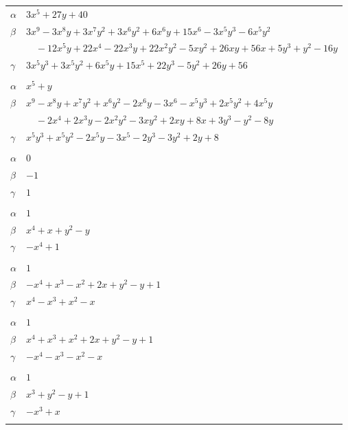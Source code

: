 \documentclass[11pt]{article}
\begin{document}
\begin{longtable}{@{}ll@{}}
$\alpha$ & $3x^{5}+27y+40$\\
$\beta$ & $3x^{9}-3x^{8}y+3x^{7}y^{2}+3x^{6}y^{2}+6x^{6}y+15x^{6}-3x^{5}y^{3}-6x^{5}y^{2}$\\
 & $\quad -12x^{5}y+22x^{4}-22x^{3}y+22x^{2}y^{2}-5xy^{2}+26xy+56x+5y^{3}+y^{2}-16y$\\
$\gamma$ & $3x^{5}y^{3}+3x^{5}y^{2}+6x^{5}y+15x^{5}+22y^{3}-5y^{2}+26y+56$\\
\addlinespace[3pt]
\multicolumn{2}{@{}l}{$\{i,j\}=\{1,33\}$, $k_{ij}=2^{4}$}\\
$\alpha$ & $x^{5}+y$\\
$\beta$ & $x^{9}-x^{8}y+x^{7}y^{2}+x^{6}y^{2}-2x^{6}y-3x^{6}-x^{5}y^{3}+2x^{5}y^{2}+4x^{5}y$\\
 & $\quad -2x^{4}+2x^{3}y-2x^{2}y^{2}-3xy^{2}+2xy+8x+3y^{3}-y^{2}-8y$\\
$\gamma$ & $x^{5}y^{3}+x^{5}y^{2}-2x^{5}y-3x^{5}-2y^{3}-3y^{2}+2y+8$\\
\addlinespace[3pt]
\multicolumn{2}{@{}l}{$\{i,j\}=\{2,9\}$, $k_{ij}=3$}\\
$\alpha$ & $0$\\
$\beta$ & $-1$\\
$\gamma$ & $1$\\
\addlinespace[3pt]
\multicolumn{2}{@{}l}{$\{i,j\}=\{2,10\}$, $k_{ij}=3$}\\
$\alpha$ & $1$\\
$\beta$ & $x^{4}+x+y^{2}-y$\\
$\gamma$ & $-x^{4}+1$\\
\addlinespace[3pt]
\multicolumn{2}{@{}l}{$\{i,j\}=\{2,14\}$, $k_{ij}=3$}\\
$\alpha$ & $1$\\
$\beta$ & $-x^{4}+x^{3}-x^{2}+2x+y^{2}-y+1$\\
$\gamma$ & $x^{4}-x^{3}+x^{2}-x$\\
\addlinespace[3pt]
\multicolumn{2}{@{}l}{$\{i,j\}=\{2,16\}$, $k_{ij}=3$}\\
$\alpha$ & $1$\\
$\beta$ & $x^{4}+x^{3}+x^{2}+2x+y^{2}-y+1$\\
$\gamma$ & $-x^{4}-x^{3}-x^{2}-x$\\
\addlinespace[3pt]
\multicolumn{2}{@{}l}{$\{i,j\}=\{2,17\}$, $k_{ij}=3$}\\
$\alpha$ & $1$\\
$\beta$ & $x^{3}+y^{2}-y+1$\\
$\gamma$ & $-x^{3}+x$\\
\addlinespace[3pt]
\multicolumn{2}{@{}l}{$\{i,j\}=\{2,18\}$, $k_{ij}=2\cdot 11$}\\

\end{longtable}
\end{document}
